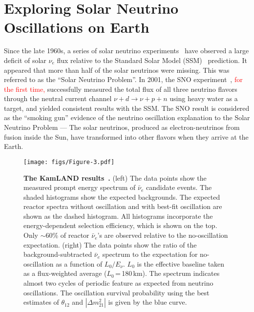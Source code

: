 \documentclass[aps,twocolumn,preprintnumbers,amsmath,superscriptaddress,amssymb,floats,nofootinbib]{revtex4-1}
\begin{document}
\vspace{10pt}

\twocolumngrid


\section{Exploring Solar Neutrino Oscillations on Earth} 
\label{sec:kamland}

Since the late 1960s, a series of solar neutrino experiments~\cite{Homestake,GALLEX,SAGE,Kamiokande,Super-Kamiokande} have observed a large deficit of solar $\nu_e$ flux relative to the Standard Solar Model (SSM)~\cite{Bahcall} prediction. 
It appeared that more than half of the solar neutrinos were missing. 
This was referred to as the ``Solar Neutrino Problem''. 
In 2001, the SNO experiment~\cite{SNO}, \textcolor{red}{for the first time,} successfully measured the total flux of all three neutrino flavors through the neutral current channel $\nu + d \to \nu + p + n$ using heavy water as a target, and yielded consistent results with the SSM. 
The SNO result is considered as the ``smoking gun'' evidence of the neutrino oscillation explanation to the Solar Neutrino Problem --- The solar neutrinos, produced as electron-neutrinos from fusion inside the Sun, have transformed into other flavors when they arrive at the Earth.

\begin{figure*}[htb] \label{fig:kamland}
  \centering
  \texttt{[image: figs/Figure-3.pdf]}
  \caption{{\bf The KamLAND results~\cite{Kamland08}.} (left) The data points show the measured prompt energy spectrum of $\bar\nu_e$ candidate events. The shaded histograms show the expected backgrounds. The expected reactor spectra without oscillation and with best-fit oscillation are shown as the dashed histogram. All histograms incorporate the energy-dependent selection efficiency, which is shown on the top. Only $\sim$60\% of reactor $\bar\nu_e$'s are observed relative to the no-oscillation expectation. 
  (right) The data points show the ratio of the background-subtracted
  $\bar\nu_e$ spectrum to the expectation for no-oscillation as a
  function of $L_{0}/E_{\nu}$. $L_{0}$ is the effective baseline taken as a
  flux-weighted average ($L_{0}$\,=\,180\,km). The spectrum indicates almost two cycles of periodic feature as expected from neutrino oscillations. The oscillation survival probability using the best estimates of $\theta_{12}$ and $|\Delta{m}^2_{21}|$ is given by the blue curve. 
  }
\end{figure*}
\end{document}
